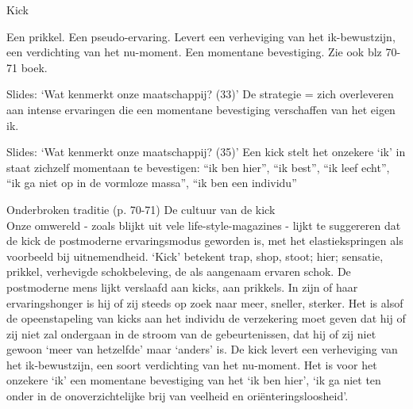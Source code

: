 \documentclass[main.tex]{subfiles}
\begin{document}
\begin{examenvraag}
    \begin{vraag}
        Kick
    \end{vraag}

    \begin{antwoord}
        Een prikkel.
        Een pseudo-ervaring.
        Levert een verheviging van het ik-bewustzijn, een verdichting van het nu-moment.
        Een momentane bevestiging. Zie ook blz 70-71 boek.
        \begin{citaat}{Slides: `Wat kenmerkt onze maatschappij? (33)'}
            De strategie = zich overleveren aan intense ervaringen die een momentane bevestiging verschaffen van het eigen ik.
        \end{citaat}
        \begin{citaat}{Slides: `Wat kenmerkt onze maatschappij? (35)'}
            Een kick stelt het onzekere `ik' in staat zichzelf momentaan te bevestigen: ``ik ben hier'', ``ik best'', ``ik leef echt'', ``ik ga niet op in de vormloze massa'', ``ik ben een individu''
        \end{citaat}
        \begin{citaat}{Onderbroken traditie (p. 70-71)}
            De cultuur van de kick\\
            Onze omwereld - zoals blijkt uit vele life-style-magazines - lijkt te suggereren dat de kick de postmoderne ervaringsmodus geworden is, met het elastiekspringen als voorbeeld bij uitnemendheid.
            `Kick' betekent trap, shop, stoot; hier; sensatie, prikkel, verhevigde schokbeleving, de als aangenaam ervaren schok.
            De postmoderne mens lijkt verslaafd aan kicks, aan prikkels.
            In zijn of haar ervaringshonger is hij of zij steeds op zoek naar meer, sneller, sterker.
            Het is alsof de opeenstapeling van kicks aan het individu de verzekering moet geven dat hij of zij niet zal ondergaan in de stroom van de gebeurtenissen, dat hij of zij niet gewoon `meer van hetzelfde' maar `anders' is.
            De kick levert een verheviging van het ik-bewustzijn, een soort verdichting van het nu-moment.
            Het is voor het onzekere `ik' een momentane bevestiging van het `ik ben hier', `ik ga niet ten onder in de onoverzichtelijke brij van veelheid en ori\"enteringsloosheid'.
        \end{citaat}
    \end{antwoord}
\end{examenvraag}
\end{document}
